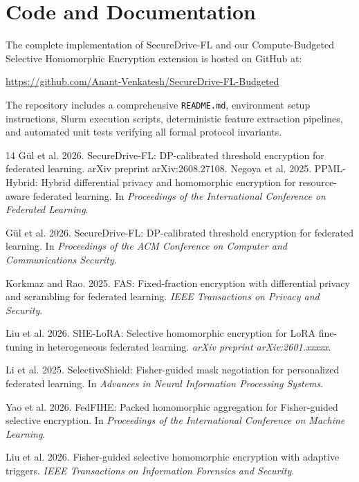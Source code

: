 \documentclass[acmtog,nonacm]{acmart}
\begin{document}
\section{Code and Documentation}
\label{sec:code}
The complete implementation of SecureDrive-FL and our Compute-Budgeted Selective Homomorphic Encryption extension is hosted on GitHub at:
\begin{center}
\url{https://github.com/Anant-Venkatesh/SecureDrive-FL-Budgeted}
\end{center}
The repository includes a comprehensive \texttt{README.md}, environment setup instructions, Slurm execution scripts, deterministic feature extraction pipelines, and automated unit tests verifying all formal protocol invariants.

\clearpage

\begin{thebibliography}{14}
 G{\"u}l et al. 2026. SecureDrive-FL: DP-calibrated threshold encryption for federated learning. arXiv preprint arXiv:2608.27108.
Negoya et al. 2025. PPML-Hybrid: Hybrid differential privacy and homomorphic encryption for resource-aware federated learning. In \emph{Proceedings of the International Conference on Federated Learning}.

G\"ul et al. 2026. SecureDrive-FL: DP-calibrated threshold encryption for federated learning. In \emph{Proceedings of the ACM Conference on Computer and Communications Security}.

Korkmaz and Rao. 2025. FAS: Fixed-fraction encryption with differential privacy and scrambling for federated learning. \emph{IEEE Transactions on Privacy and Security}.

Liu et al. 2026. SHE-LoRA: Selective homomorphic encryption for LoRA fine-tuning in heterogeneous federated learning. \emph{arXiv preprint arXiv:2601.xxxxx}.

Li et al. 2025. SelectiveShield: Fisher-guided mask negotiation for personalized federated learning. In \emph{Advances in Neural Information Processing Systems}.

Yao et al. 2026. FedFIHE: Packed homomorphic aggregation for Fisher-guided selective encryption. In \emph{Proceedings of the International Conference on Machine Learning}.

Liu et al. 2026. Fisher-guided selective homomorphic encryption with adaptive triggers. \emph{IEEE Transactions on Information Forensics and Security}.


\end{thebibliography}
\end{document}
